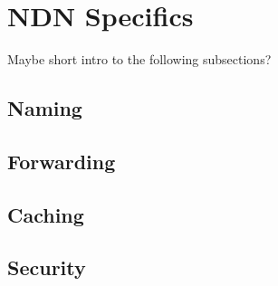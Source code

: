\section{NDN Specifics}
Maybe short intro to the following subsections?

\subsection{Naming}

\subsection{Forwarding}

\subsection{Caching}

\subsection{Security}

